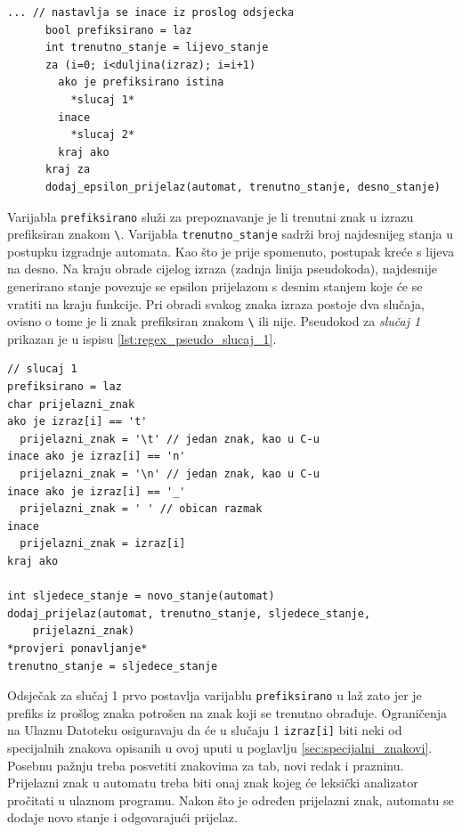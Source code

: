 \documentclass[times, 12pt, utf8]{book}
\begin{document}
\begin{lstlisting}[caption={Obrada nadovezivanja u funkciji \texttt{pretvori}.},label=lst:regex_pseudo_pretvori_3]
      ... // nastavlja se inace iz proslog odsjecka
      bool prefiksirano = laz
      int trenutno_stanje = lijevo_stanje
      za (i=0; i<duljina(izraz); i=i+1)
        ako je prefiksirano istina
          *slucaj 1*
        inace
          *slucaj 2*
        kraj ako
      kraj za
      dodaj_epsilon_prijelaz(automat, trenutno_stanje, desno_stanje)
\end{lstlisting}

Varijabla \verb|prefiksirano| služi za prepoznavanje je li trenutni znak u izrazu prefiksiran znakom \verb|\|.
Varijabla \verb|trenutno_stanje| sadrži broj najdesnijeg stanja u postupku izgradnje automata.
Kao što je prije spomenuto, postupak kreće s lijeva na desno.
Na kraju obrade cijelog izraza (zadnja linija pseudokoda), najdesnije generirano stanje povezuje se epsilon prijelazom s desnim stanjem koje će se vratiti na kraju funkcije.
Pri obradi svakog znaka izraza postoje dva slučaja, ovisno o tome je li znak prefiksiran znakom \verb|\| ili nije.
Pseudokod za \emph{slučaj 1} prikazan je u ispisu \ref{lst:regex_pseudo_slucaj_1}.

\begin{lstlisting}[caption={Slučaj 1 u funkciji \texttt{pretvori}.},label=lst:regex_pseudo_slucaj_1]
// slucaj 1
prefiksirano = laz
char prijelazni_znak
ako je izraz[i] == 't'
  prijelazni_znak = '\t' // jedan znak, kao u C-u
inace ako je izraz[i] == 'n'
  prijelazni_znak = '\n' // jedan znak, kao u C-u
inace ako je izraz[i] == '_'
  prijelazni_znak = ' ' // obican razmak
inace
  prijelazni_znak = izraz[i]
kraj ako

int sljedece_stanje = novo_stanje(automat)
dodaj_prijelaz(automat, trenutno_stanje, sljedece_stanje, 
    prijelazni_znak)
*provjeri ponavljanje*
trenutno_stanje = sljedece_stanje
\end{lstlisting}

Odsječak za slučaj 1 prvo postavlja varijablu \verb|prefiksirano| u laž zato jer je prefiks iz prošlog znaka potrošen na znak koji se trenutno obrađuje.
Ograničenja na Ulaznu Datoteku osiguravaju da će u slučaju 1 \verb|izraz[i]| biti neki od specijalnih znakova opisanih u ovoj uputi u poglavlju \ref{sec:specijalni_znakovi}.
Posebnu pažnju treba posvetiti znakovima za tab, novi redak i prazninu.
Prijelazni znak u automatu treba biti onaj znak kojeg će leksički analizator pročitati u ulaznom programu.
Nakon što je određen prijelazni znak, automatu se dodaje novo stanje i odgovarajući prijelaz. 
\end{document}
